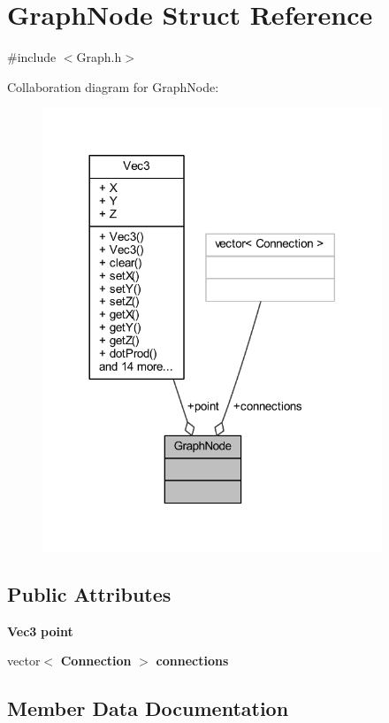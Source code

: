 \section{Graph\+Node Struct Reference}
\label{struct_graph_node}


{\ttfamily \#include $<$Graph.\+h$>$}



Collaboration diagram for Graph\+Node\+:
\nopagebreak
\begin{figure}[H]
\begin{center}
\leavevmode
\includegraphics[width=288pt]{dd/dd7/struct_graph_node__coll__graph}
\end{center}
\end{figure}
\subsection*{Public Attributes}
\begin{DoxyCompactItemize}
\item 
{\bf Vec3} {\bf point}
\item 
vector$<$ {\bf Connection} $>$ {\bf connections}
\end{DoxyCompactItemize}


\subsection{Member Data Documentation}
